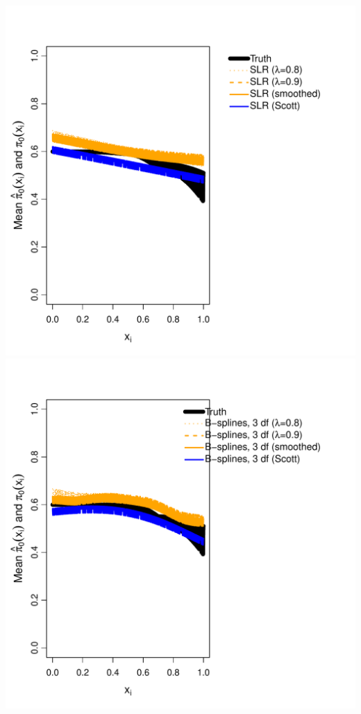 \documentclass{article}\usepackage[]{graphicx}\usepackage[]{color}
\makeatletter
\def\maxwidth{ %
  \ifdim\Gin@nat@width>\linewidth
    \linewidth
  \else
    \Gin@nat@width
  \fi
}
\newenvironment{knitrout}{}{} %
\makeatother
\begin{document}
\begin{knitrout}
{\includegraphics[width=\maxwidth]{Figures/unnamed-chunk-1-13} 
\includegraphics[width=\maxwidth]{Figures/unnamed-chunk-1-14} 

}



\end{knitrout}
\end{document}
